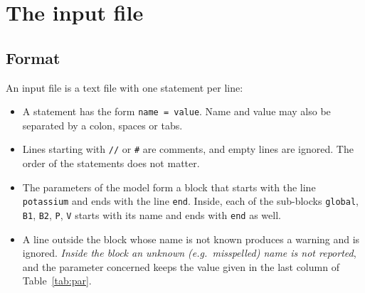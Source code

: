 \documentclass[11pt]{article}
\newcommand{\code}[1]{\texttt{#1}}
\begin{document}
\section{The input file}
\label{sec:input}

\subsection{Format}
An input file is a text file with one statement per line:
\begin{itemize}
  \item A statement has the form \code{name = value}. Name and value may also be separated by a colon, spaces or tabs.
  \item Lines starting with \code{//} or \code{\#} are comments, and empty lines are ignored. The order of the statements does not matter.
  \item The parameters of the model form a block that starts with the line \code{potassium} and ends with the line \code{end}. Inside, each of the sub-blocks \code{global}, \code{B1}, \code{B2}, \code{P}, \code{V} starts with its name and ends with \code{end} as well.
  \item A line outside the block whose name is not known produces a warning and is ignored. \emph{Inside the block an unknown (e.g.\ misspelled) name is not reported}, and the parameter concerned keeps the value given in the last column of Table~\ref{tab:par}.
\end{itemize}
\end{document}
